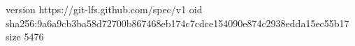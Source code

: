 version https://git-lfs.github.com/spec/v1
oid sha256:9a6a9cb3ba58d72700b867468eb174c7cdce154090e874c2938edda15ec55b17
size 5476
